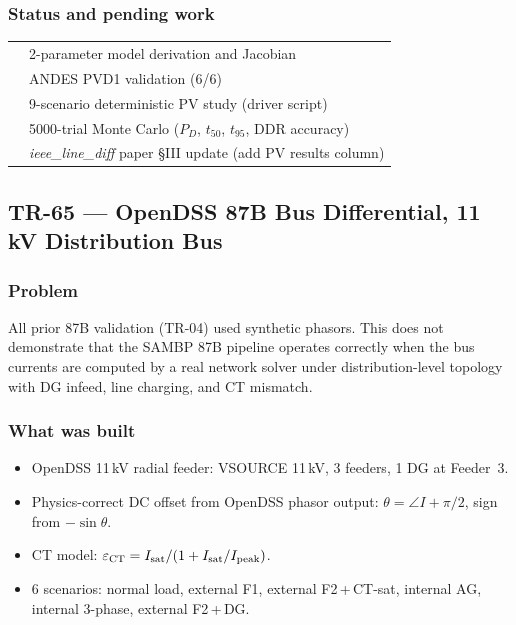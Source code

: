 \documentclass[12pt,a4paper]{article}
\newcommand{\cmark}{\ding{51}}
\newcommand{\pmark}{\ding{118}}   %
\begin{document}
\subsubsection{Status and pending work}
\begin{tabular}{ll}
  \cmark & 2-parameter model derivation and Jacobian \\
  \cmark & ANDES PVD1 validation (6/6) \\
  \pmark & 9-scenario deterministic PV study (driver script) \\
  \pmark & 5000-trial Monte Carlo ($P_D$, $t_{50}$, $t_{95}$, DDR accuracy) \\
  \pmark & \textit{ieee\_line\_diff} paper §III update (add PV results column) \\
\end{tabular}

\bigskip

\subsection{TR-65 — OpenDSS 87B Bus Differential, 11\,kV Distribution Bus}
\label{sec:tr65}

\subsubsection{Problem}
All prior 87B validation (TR-04) used synthetic phasors.  This does not
demonstrate that the SAMBP 87B pipeline operates correctly when the bus
currents are computed by a real network solver under distribution-level
topology with DG infeed, line charging, and CT mismatch.

\subsubsection{What was built}
\begin{itemize}
  \item OpenDSS 11\,kV radial feeder: VSOURCE 11\,kV, 3 feeders, 1 DG at Feeder~3.
  \item Physics-correct DC offset from OpenDSS phasor output:
    $\theta = \angle I + \pi/2$, sign from $-\sin\theta$.
  \item CT model: $\varepsilon_{\rm CT} = I_{\rm sat}/(1 + I_{\rm sat}/I_{\rm peak})$.
  \item 6 scenarios: normal load, external F1, external F2\,+\,CT-sat,
    internal AG, internal 3-phase, external F2\,+\,DG.
\end{itemize}
\end{document}
